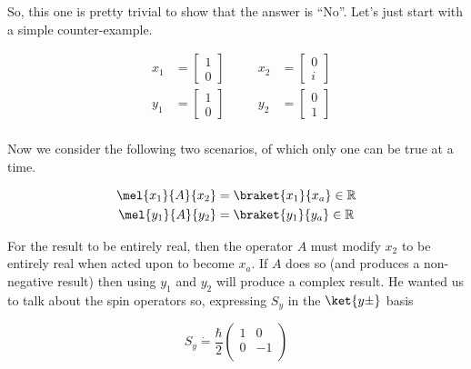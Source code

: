 \begin{answer}
  So, this one is pretty trivial to show that the answer is ``No''.
  Let's just start with a simple counter-example.

  \begin{equation}
    \begin{alignedat}{3}
      & x_1 &= \begin{bmatrix}1\\0\end{bmatrix}
        &
        \quad
        & x_2 &= \begin{bmatrix}0\\i\end{bmatrix}
          \\
      & y_1 &= \begin{bmatrix}1\\0\end{bmatrix}
        &
        \quad
        & y_2 &= \begin{bmatrix}0\\1\end{bmatrix}
          \\
    \end{alignedat}
  \end{equation}

  Now we consider the following two scenarios, of which only one can
  be true at a time.

  \begin{equation}
    \begin{split}
    \mel{x_1}{A}{x_2} &= \braket{x_1}{x_a} \in \mathbb{R}\\
    \mel{y_1}{A}{y_2} &= \braket{y_1}{y_a} \in \mathbb{R}\\
    \end{split}
  \end{equation}

  For the result to be entirely real, then the operator $A$ must
  modify $x_2$ to be entirely real when acted upon to become $x_a$.
  If $A$ does so (and produces a non-negative result) then using $y_1$
  and $y_2$ will produce a complex result.  He wanted us to talk about
  the spin operators so, expressing $S_y$ in the $\ket{y\pm}$ basis

  \begin{equation}
    S_y \dot{=} \frac{\hbar}{2}\begin{pmatrix}1&0\\0&-1\\\end{pmatrix}
  \end{equation}


\end{answer}
